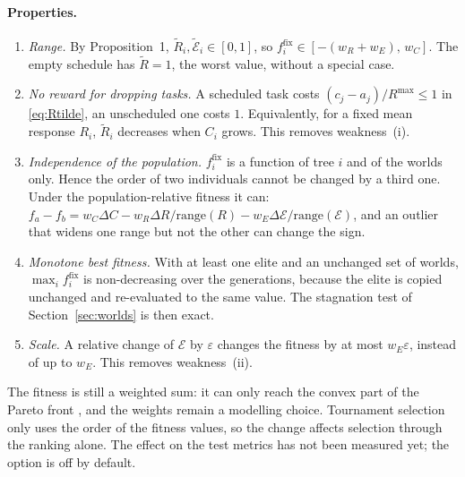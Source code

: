 \paragraph{Properties.}
\begin{enumerate}
  \item \emph{Range.} By Proposition~1, $\tilde R_i,\tilde{\mathcal{E}}_i\in[0,1]$,
        so $f^{\mathrm{fix}}_i\in[-(w_R+w_E),\,w_C]$. The empty schedule has
        $\tilde R=1$, the worst value, without a special case.
  \item \emph{No reward for dropping tasks.} A scheduled task costs
        $(c_j-a_j)/R^{\max}\le1$ in \eqref{eq:Rtilde}, an unscheduled one costs
        $1$. Equivalently, for a fixed mean response $R_i$, $\tilde R_i$
        decreases when $C_i$ grows. This removes weakness~(i).
  \item \emph{Independence of the population.} $f^{\mathrm{fix}}_i$ is a function
        of tree $i$ and of the worlds only. Hence the order of two individuals
        cannot be changed by a third one. Under the population-relative fitness
        it can: $f_a-f_b=w_C\Delta C-w_R\Delta R/\mathrm{range}(R)-w_E\Delta\mathcal{E}/\mathrm{range}(\mathcal{E})$,
        and an outlier that widens one range but not the other can change the
        sign.
  \item \emph{Monotone best fitness.} With at least one elite and an unchanged
        set of worlds, $\max_i f^{\mathrm{fix}}_i$ is non-decreasing over the
        generations, because the elite is copied unchanged and re-evaluated to
        the same value. The stagnation test of Section~\ref{sec:worlds} is then
        exact.
  \item \emph{Scale.} A relative change of $\mathcal{E}$ by $\varepsilon$ changes
        the fitness by at most $w_E\varepsilon$, instead of up to $w_E$. This
        removes weakness~(ii).
\end{enumerate}
The fitness is still a weighted sum: it can only reach the convex part of the
Pareto front \citep{das1997weighted}, and the weights remain a modelling choice.
Tournament selection only uses the order of the fitness values, so the change
affects selection through the ranking alone. The effect on the test metrics
has not been measured yet; the option is off by default.

